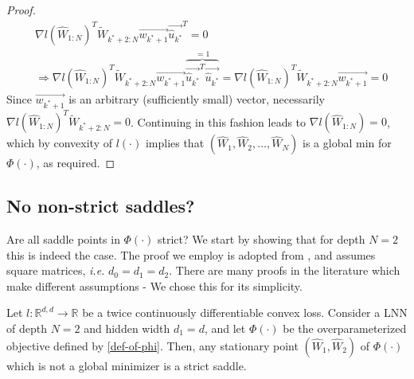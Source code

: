 \documentclass[12pt]{article}
\newcommand{\ie}{{\it i.e. }}
\begin{document}
\begin{proof}
	    \begin{align*}
	        & \nabla{l({\widehat{W}_{1:N}})}^T {\widetilde{W}_{k^\ast+2:N}} \overrightarrow{w_{k^\ast+1}} \overrightarrow{{\widehat{u}_{k^\ast}}}^T = 0 \\
	        & \Longrightarrow \nabla{l({\widehat{W}_{1:N}})}^T {\widetilde{W}_{k^\ast+2:N}} \overrightarrow{w_{k^\ast+1}} \overbrace{\overrightarrow{{\widehat{u}_{k^\ast}}}^T \overrightarrow{{\widehat{u}_{k^\ast}}}}^{=1} = \nabla{l({\widehat{W}_{1:N}})}^T {\widetilde{W}_{k^\ast+2:N}} \overrightarrow{w_{k^\ast+1}} = 0
	    \end{align*}
	    Since $\overrightarrow{w_{k^\ast+1}}$ is an arbitrary (sufficiently small) vector, necessarily $\nabla{l({\widehat{W}_{1:N}})^T} {\widetilde{W}_{k^\ast + 2:N}} = 0$. \newline
	    Continuing in this fashion leads to $\nabla{l({\widehat{W}_{1:N}})} = 0$, which by convexity of $l(\cdot)$ implies that $({\widehat{W}_1}, {\widehat{W}_2}, ..., {\widehat{W}_N})$ is a global min for $\Phi(\cdot)$, as required.
	\end{proof}
	\subsection{No non-strict saddles?}
	Are all saddle points in $\Phi(\cdot)$ strict? We start by showing that for depth $N=2$ this is indeed the case. The proof we employ is adopted from \cite{critical-points}, and assumes square matrices, \ie $ d_0 = d_1 = d_2$. There are many proofs in the literature which make different assumptions - We chose this for its simplicity.
	\begin{theorem}
    \label{thm:depth 2 LNNs have no non-strict saddles}
    Let $l:\mathbb{R}^{d,d} \to \mathbb{R}$ be a twice continuously differentiable convex loss. Consider a LNN of depth $N=2$ and hidden width $d_1=d$, and let $\Phi(\cdot)$ be the overparameterized objective defined by \eqref{def-of-phi}. Then, any stationary point $({\widehat{W}_1}, {\widehat{W}_2})$ of $\Phi(\cdot)$ which is not a global minimizer is a strict saddle.
    \end{theorem}
    
\end{document}
